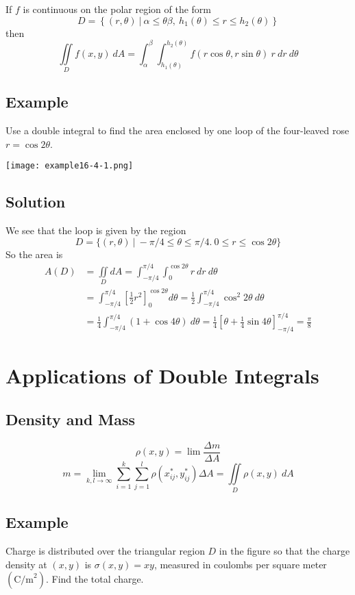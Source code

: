 If $f$ is continuous on the polar region of the form
$$D=\left\{(r,\theta)\:|\:\alpha\leq\theta\beta,\: h_1(\theta)\leq r\leq h_2(\theta)\right\}$$
then
$$\iint\limits_D f(x,y)\:dA=\int_\alpha^\beta\int_{h_1(\theta)}^{h_2(\theta)}
    f(r\cos{\theta}, r\sin{\theta})\:r\:dr\:d\theta$$

\subsection*{Example}
Use a double integral to find the area enclosed by one loop of the four-leaved rose
$r=\cos{2\theta}$.
\begin{center}
    \texttt{[image: example16-4-1.png]}
\end{center}

\subsection*{Solution}
We see that the loop is given by the region
$$D=\{(r,\theta)\:|\:-\pi/4\leq\theta\leq\pi/4.\:0\leq r\leq\cos{2\theta}\}$$
So the area is
\begin{align*}
    A(D) & =\iint\limits_D dA=\int_{-\pi/4}^{\pi/4}\int_0^{\cos{2\theta}}r\:dr\:d\theta                                                                       \\
         & =\int_{-\pi/4}^{\pi/4}\left[\frac{1}{2}r^2\right]_0^{\cos{2\theta}}d\theta=\frac{1}{2}\int_{-\pi/4}^{\pi/4} \cos^2{2\theta}\:d\theta               \\
         & =\frac{1}{4}\int_{-\pi/4}^{\pi/4}(1+\cos{4\theta})\:d\theta=\frac{1}{4}\left[\theta+\frac{1}{4}\sin{4\theta}\right]_{-\pi/4}^{\pi/4}=\frac{\pi}{8}
\end{align*}

\section{Applications of Double Integrals}

\subsection*{Density and Mass}
$$\rho(x,y)=\lim\frac{\Delta m}{\Delta A}$$
$$m=\lim_{k,l\to\infty}\sum_{i=1}^k\sum_{j=1}^l\rho(x_{ij}^*,y_{ij}^*)\Delta A=
    \iint\limits_D\rho(x,y)\:dA$$

\subsection*{Example}
Charge is distributed over the triangular region $D$ in the figure so that the charge
density at $(x,y)$ is $\sigma(x,y)=xy$, measured in coulombs per square meter
$(\text{C/m}^2)$. Find the total charge.

